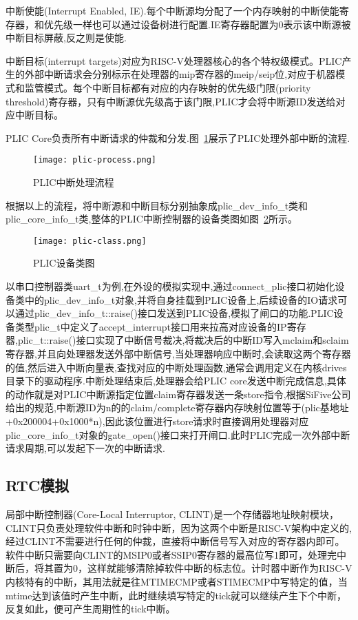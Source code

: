 中断使能(Interrupt Enabled, IE).每个中断源均分配了一个内存映射的中断使能寄存器，和优先级一样也可以通过设备树进行配置.IE寄存器配置为0表示该中断源被中断目标屏蔽,反之则是使能.


中断目标(interrupt targets)对应为RISC-V处理器核心的各个特权级模式。PLIC产生的外部中断请求会分别标示在处理器的mip寄存器的meip/seip位,对应于机器模式和监管模式。每个中断目标都有对应的内存映射的优先级门限(priority threshold)寄存器，只有中断源优先级高于该门限,PLIC才会将中断源ID发送给对应中断目标。


PLIC Core负责所有中断请求的仲裁和分发.图~\ref{fig:plic-process}展示了PLIC处理外部中断的流程.
\begin{figure}[h]
    \centering
    \texttt{[image: plic-process.png]}
    \caption{PLIC中断处理流程}
    \label{fig:plic-process}
\end{figure}


根据以上的流程，将中断源和中断目标分别抽象成plic\_dev\_info\_t类和plic\_core\_info\_t类,整体的PLIC中断控制器的设备类图如图~\ref{fig:plic-class}所示。
\begin{figure}[H]
    \centering
    \texttt{[image: plic-class.png]}
    \caption{PLIC设备类图}
    \label{fig:plic-class}
\end{figure}
以串口控制器类uart\_t为例,在外设的模拟实现中,通过connect\_plic接口初始化设备类中的plic\_dev\_info\_t对象,并将自身挂载到PLIC设备上,后续设备的IO请求可以通过plic\_dev\_info\_t::raise()接口发送到PLIC设备,模拟了闸口的功能.PLIC设备类型plic\_t中定义了accept\_interrupt接口用来拉高对应设备的IP寄存器,plic\_t::raise()接口实现了中断信号裁决,将裁决后的中断ID写入mclaim和sclaim寄存器,并且向处理器发送外部中断信号,当处理器响应中断时,会读取这两个寄存器的值,然后进入中断向量表,查找对应的中断处理函数,通常会调用定义在内核drives目录下的驱动程序.中断处理结束后,处理器会给PLIC core发送中断完成信息,具体的动作就是对PLIC中断源指定位置claim寄存器发送一条store指令,根据SiFive公司给出的规范,中断源ID为n的的claim/complete寄存器内存映射位置等于(plic基地址+0x200004+0x1000*n),因此该位置进行store请求时直接调用处理器对应plic\_core\_info\_t对象的gate\_open()接口来打开闸口.此时PLIC完成一次外部中断请求周期,可以发起下一次的中断请求.




\subsection{RTC模拟}

局部中断控制器(Core-Local Interruptor, CLINT)是一个存储器地址映射模块，CLINT只负责处理软件中断和时钟中断，因为这两个中断是RISC-V架构中定义的,经过CLINT不需要进行任何的仲裁，直接将中断信号写入对应的寄存器内即可。软件中断只需要向CLINT的MSIP0或者SSIP0寄存器的最高位写1即可，处理完中断后，将其置为0，这样就能够清除掉软件中断的标志位。计时器中断作为RISC-V内核特有的中断，其用法就是往MTIMECMP或者STIMECMP中写特定的值，当mtime达到该值时产生中断，此时继续填写特定的tick就可以继续产生下个中断，反复如此，便可产生周期性的tick中断。

